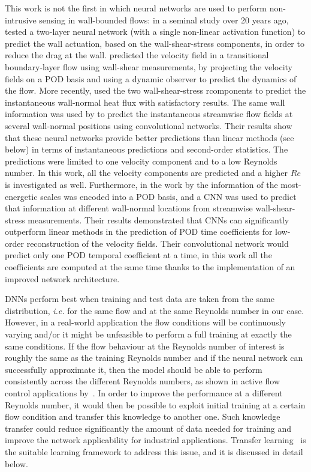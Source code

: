 This work is not the first in which neural networks are used to perform non-intrusive sensing in wall-bounded flows: in a seminal study over 20 years ago, \cite{lee1997application} tested a two-layer neural network (with a single non-linear activation function) to predict the wall actuation, based on the wall-shear-stress components, in order to reduce the drag at the wall.
\citet{inigo2014dynamic} predicted the velocity field in a transitional boundary-layer flow using wall-shear measurements, by projecting the velocity fields on a POD basis and using a dynamic observer to predict the dynamics of the flow.
More recently, \citet{kim2020prediction} used the two wall-shear-stress rcomponents to predict the instantaneous wall-normal heat flux  with satisfactory results.
The same wall information was used by \citet{guastoni2020prediction} to predict the instantaneous streamwise flow fields at several wall-normal positions using convolutional networks.
Their results show that these neural networks provide better predictions than linear methods (see below) in terms of instantaneous predictions and second-order statistics.
The predictions were limited to one velocity component and to a low Reynolds number. In this work, all the velocity components are predicted and a higher $Re$ is investigated as well.
Furthermore, in the work by \citet{guemes2019sensing} the information of the most-energetic scales was encoded into a POD basis, and a CNN was used to predict that information at different wall-normal locations from streamwise wall-shear-stress measurements.
Their results demonstrated that CNNs can significantly outperform linear methods in the prediction of POD time coefficients for low-order reconstruction of the velocity fields.
Their convolutional network would predict only one POD temporal coefficient at a time, in this work all the coefficients are computed at the same time thanks to the implementation of an improved network architecture.

DNNs perform best when training and test data are taken from the same distribution, {\it i.e.} for the same flow and at the same Reynolds number in our case.
However, in  a real-world application the flow conditions will be continuously varying and/or it might be unfeasible to perform a full training at exactly the same conditions.
If the flow behaviour at the Reynolds number of interest is roughly the same as the training Reynolds number and if the neural network can successfully approximate it, then the model should be able to perform consistently across the different Reynolds numbers, as shown in active flow control applications by~\citet{tang2020robust}.
In order to improve the performance at a different Reynolds number, it would then be possible to exploit initial training at a certain flow condition and transfer this knowledge to another one.
Such knowledge transfer could reduce significantly the amount of data needed for training and improve the network applicability for industrial applications.
Transfer learning~\citep{pan2009survey} is the suitable learning framework to address this issue, and it is discussed in detail below.

